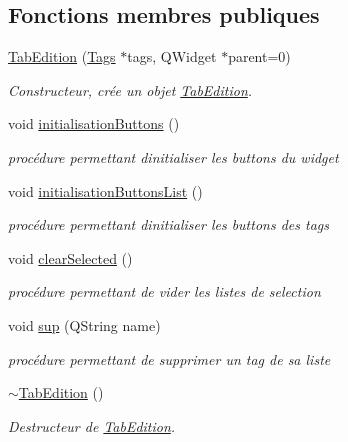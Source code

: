 \subsection*{Fonctions membres publiques}
\begin{DoxyCompactItemize}
\item 
\hyperlink{class_tab_edition_ad02a3fd1d5aede64426945dc7e157a68}{Tab\+Edition} (\hyperlink{class_tags}{Tags} $\ast$tags, Q\+Widget $\ast$parent=0)
\begin{DoxyCompactList}\small\item\em Constructeur, crée un objet \hyperlink{class_tab_edition}{Tab\+Edition}. \end{DoxyCompactList}\item 
void \hyperlink{class_tab_edition_a2730367dae1f80a45875acb579b6f93e}{initialisation\+Buttons} ()\hypertarget{class_tab_edition_a2730367dae1f80a45875acb579b6f93e}{}\label{class_tab_edition_a2730367dae1f80a45875acb579b6f93e}

\begin{DoxyCompactList}\small\item\em procédure permettant d\textquotesingle{}initialiser les buttons du widget \end{DoxyCompactList}\item 
void \hyperlink{class_tab_edition_a9be046c1366dbee5f88becd6e02fe413}{initialisation\+Buttons\+List} ()\hypertarget{class_tab_edition_a9be046c1366dbee5f88becd6e02fe413}{}\label{class_tab_edition_a9be046c1366dbee5f88becd6e02fe413}

\begin{DoxyCompactList}\small\item\em procédure permettant d\textquotesingle{}initialiser les buttons des tags \end{DoxyCompactList}\item 
void \hyperlink{class_tab_edition_a9c8e4c8d033c7c0d5b4e1a37cb47d0f3}{clear\+Selected} ()\hypertarget{class_tab_edition_a9c8e4c8d033c7c0d5b4e1a37cb47d0f3}{}\label{class_tab_edition_a9c8e4c8d033c7c0d5b4e1a37cb47d0f3}

\begin{DoxyCompactList}\small\item\em procédure permettant de vider les listes de selection \end{DoxyCompactList}\item 
void \hyperlink{class_tab_edition_a844a8c4c5554d991957682ea9060cc59}{sup} (Q\+String name)
\begin{DoxyCompactList}\small\item\em procédure permettant de supprimer un tag de sa liste \end{DoxyCompactList}\item 
\hyperlink{class_tab_edition_ac7c6c640977a8c3273ee816762972f40}{$\sim$\+Tab\+Edition} ()\hypertarget{class_tab_edition_ac7c6c640977a8c3273ee816762972f40}{}\label{class_tab_edition_ac7c6c640977a8c3273ee816762972f40}

\begin{DoxyCompactList}\small\item\em Destructeur de \hyperlink{class_tab_edition}{Tab\+Edition}. \end{DoxyCompactList}\end{DoxyCompactItemize}
